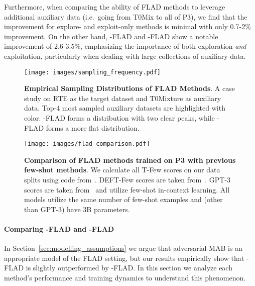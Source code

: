 Furthermore, when comparing the ability of FLAD methods to leverage additional auxiliary data (i.e.\ going from T0Mix to all of P3), we find that the improvement for explore- and exploit-only methods is minimal with only 0.7-2\% improvement. On the other hand, \ex{}-FLAD and \ucb{}-FLAD show a notable improvement of 2.6-3.5\%, emphasizing the importance of both exploration \textit{and} exploitation, particularly when dealing with large collections of auxiliary data.


\begin{figure}[t]
    \centering
    \texttt{[image: images/sampling\_frequency.pdf]}
    \vspace{-2mm}
    \caption{\textbf{Empirical Sampling Distributions of FLAD Methods}. A case study on RTE as the target dataset and T0Mixture as auxiliary data.
    Top-4 most sampled auxiliary datasets are highlighted with color. \ucb{}-FLAD forms a distribution with two clear peaks, while \ex{}-FLAD forms a more flat distribution.}
    \label{fig:sampling_frequency}
\end{figure}

\begin{figure*}
    \centering
    \texttt{[image: images/flad\_comparison.pdf]}
    \vspace{-2mm}
    \caption{\textbf{Comparison of FLAD methods trained on P3 with previous few-shot methods}. We calculate all T-Few scores on our data splits using code from~\citet{liu2020tfew}. DEFT-Few scores are taken from~\citet{Ivison2022DEFT}. GPT-3 scores are taken from~\citet{NEURIPS2020_1457c0d6} and utilize few-shot in-context learning. All models utilize the same number of few-shot examples and (other than GPT-3) have 3B parameters.}
    \label{fig:comparison}
\end{figure*}

\paragraph{Comparing \ex{}-FLAD and \ucb{}-FLAD}
In Section~\ref{sec:modelling_assumptions} we argue that adversarial MAB is an appropriate model of the FLAD setting, but our results empirically show that \ex{}-FLAD is slightly outperformed by \ucb{}-FLAD. In this section we analyze each method's performance and training dynamics to understand this phenomenon.

